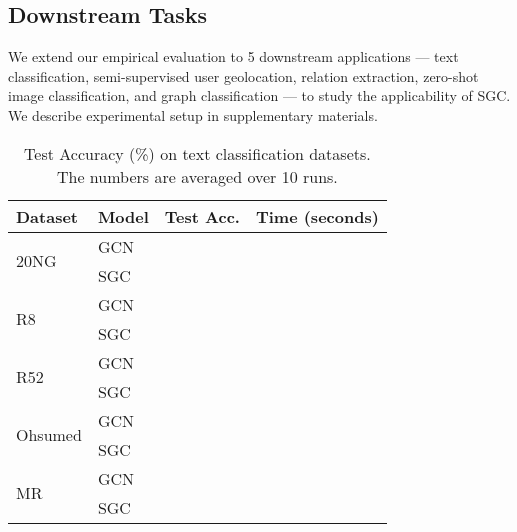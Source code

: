 \documentclass{article}
\newcommand{\method}{SGC}
\begin{document}
\subsection{Downstream Tasks}
We extend our empirical evaluation to 5 downstream applications --- text classification, semi-supervised user geolocation, relation extraction, zero-shot image classification, and graph classification --- to study the applicability of \method{}. 
We describe experimental setup in supplementary materials.

\begin{table}[tb!]
\centering
\small
\caption{Test Accuracy (\%) on text classification datasets. The numbers are averaged over 10 runs.}
\begin{tabular}{l|l|cc}
\toprule
Dataset & Model & Test Acc.  & Time (seconds)  \\
\midrule
\multirow{2}{*}{20NG} & GCN &  &  \\ & {\color{modelblue} \method{}} &  &  \\
\midrule
\multirow{2}{*}{R8} & GCN &  &  \\ & {\color{modelblue} \method{}} &  &  \\
\midrule
\multirow{2}{*}{R52} & GCN &  &  \\ & {\color{modelblue} \method{}} &  &  \\
\midrule
\multirow{2}{*}{Ohsumed} & GCN &  &  \\ & {\color{modelblue} \method{}} &  &  \\
\midrule
\multirow{2}{*}{MR} & GCN &  &  \\ & {\color{modelblue} \method{}} &  &  \\
\bottomrule
\end{tabular}
\label{table:text-base-time}
\end{table}
\end{document}
